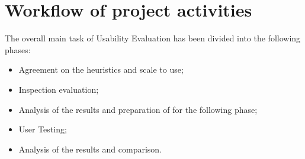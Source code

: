 \section{Workflow of project activities}
The overall main task of Usability Evaluation has been divided into the following phases:

\begin{itemize}
	\item Agreement on the heuristics and scale to use;
	\item Inspection evaluation;
	\item Analysis of the results and preparation of for the following phase;
	\item User Testing;
	\item Analysis of the results and comparison.
\end{itemize}
